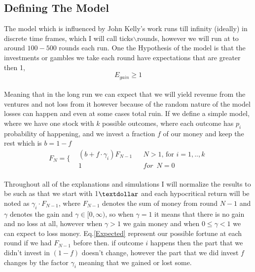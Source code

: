 \documentclass{article}
\begin{document}
	\subsection{Defining The Model}
	The model which is  influenced by John Kelly's work \cite{Finance} runs till infinity (ideally) in discrete time frames, which I will call ticks$\backslash$rounds, however we will run at to around $100-500$ rounds each run.
	\newline
	One the Hypothesis of the model is that the investments or gambles we take each round have expectations that are greater then 1,
	\begin{equation}
		\label{Expected}
	 E_{gain} \ge 1		
	\end{equation}
	\\
	Meaning that in the long run we can expect that we will yield revenue from the ventures and not loss from it however because of the random nature of the model losses can happen and even at some cases total ruin.
	\newline
	If we define a simple model, where we have one stock with $k$ possible outcomes, where each outcome has $p_i$ probability of happening, and we invest a fraction $f$ of our money and keep the rest which is $b=1-f$ 
	\begin{equation}
		\label{nes}
		F_N = \Bigg\{
		\begin{aligned}
			&(b + f\cdot \gamma _i)F_{N-1} &&N>1 \text{, for }i=1,..,k \\
			&1 &&for \enspace N=0
		\end{aligned}
	\end{equation}
	\\
	Throughout all of the explanations and simulations I will normalize the results to be such as that we start with 1$\textdollar$ and each hypocritical return will be noted as $\gamma_i\cdot F_{N-1}$, where $F_{N-1}$ denotes the sum of money from round $N-1$ and $\gamma$ denotes the gain and $\gamma\in[0,\infty)$, so when $\gamma = 1$ it means that there is no gain and no loss at all, however when 
	$\gamma > 1$ we gain money and when $ 0\le \gamma < 1$ we can expect to loss money.
	\newline
	Eq.\ref{Expected} represent our possible fortune at each round if we had $F_{N-1}$ before then. if outcome $i$ happens then the part that we didn't invest in $(1-f)$ doesn't change, however the part that we did invest $f$ changes by the factor $\gamma_i$ meaning that we gained or lost some.
	\newline\newline
\end{document}
